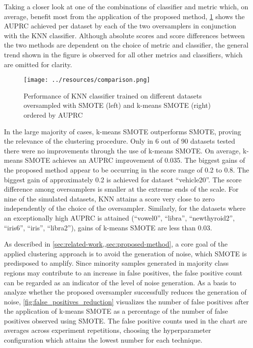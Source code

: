 \documentclass[sort&compress]{elsarticle}
\begin{document}
Taking a closer look at one of the combinations of classifier and metric which, on average, benefit most from the application of the proposed method, \cref{fig:comparison} shows the \ac{AUPRC} achieved per dataset by each of the two oversamplers in conjunction with the \ac{KNN} classifier. Although absolute scores and score differences between the two methods are dependent on the choice of metric and classifier, the general trend shown in the figure is observed for all other metrics and classifiers, which are omitted for clarity.

\begin{figure}[ht]
	\centering
	\texttt{[image: ../resources/comparison.png]}
	\caption[Performance of \acs{KNN} classifier trained on data oversampled with \acs{SMOTE} (left) and k-means \acs{SMOTE} (right)]{Performance of \acs{KNN} classifier trained on different datasets oversampled with \acs{SMOTE} (left) and k-means \acs{SMOTE} (right) ordered by \acs{AUPRC}}
	\label{fig:comparison}
\end{figure}

In the large majority of cases, k-means \ac{SMOTE} outperforms \ac{SMOTE}, proving the relevance of the clustering procedure. Only in 6 out of 90 datasets tested there were no improvements through the use of k-means \ac{SMOTE}. On average, k-means \ac{SMOTE} achieves an \ac{AUPRC} improvement of 0.035. The biggest gains of the proposed method appear to be occurring in the score range of 0.2 to 0.8. The biggest gain of approximately 0.2 is achieved for dataset ``vehicle20''. The score difference among oversamplers is smaller at the extreme ends of the scale. For nine of the simulated datasets, \ac{KNN} attains a score very close to zero independently of the choice of the oversampler. Similarly, for the datasets where an exceptionally high \ac{AUPRC} is attained (``vowel0'', ``libra'', ``newthyroid2'', ``iris6'', ``iris'', ``libra2''), gains of k-means \ac{SMOTE} are less than 0.03.

As described in \cref{sec:related-work,,sec:proposed-method}, a core goal of the applied clustering approach is to avoid the generation of noise, which \ac{SMOTE} is predisposed to amplify. Since minority samples generated in majority class regions may contribute to an increase in false positives, the false positive count can be regarded as an indicator of the level of noise generation. As a basis to analyze whether the proposed oversampler successfully reduces the generation of noise, \cref{fig:false_positives_reduction} visualizes the number of false positives after the application of k-means \ac{SMOTE} as a percentage of the number of false positives observed using \ac{SMOTE}. The false positive counts used in the chart are averages across experiment repetitions, choosing the hyperparameter configuration which attains the lowest number for each technique.
\end{document}
